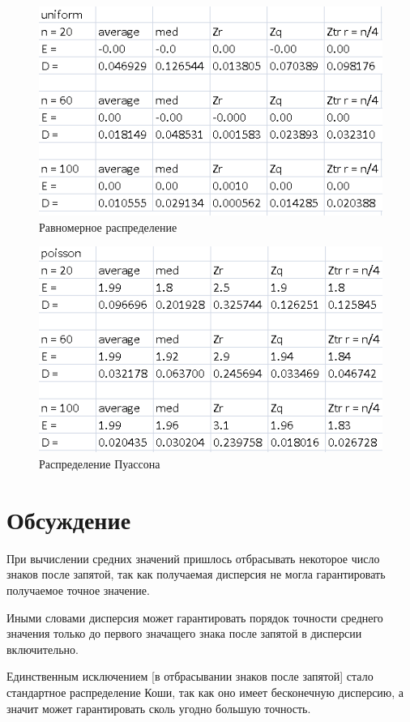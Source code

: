 \documentclass[a4]{article}
\begin{document}
\begin{figure}[H]
  \centering
  \includegraphics[width=\textwidth]{uniformFix.png}
  \caption{Равномерное распределение}
\end{figure}

\begin{figure}[H]
  \centering
  \includegraphics[width=\textwidth]{poissonFix.png} 
  \caption{Распределение Пуассона}
\end{figure}

\section{Обсуждение}
\par При вычислении средних значений пришлось отбрасывать некоторое число знаков после запятой, так как получаемая дисперсия не могла гарантировать получаемое точное значение. \par Иными словами дисперсия может гарантировать порядок точности среднего значения только до первого значащего знака после запятой в дисперсии включительно. \par Единственным исключением [в отбрасывании знаков после запятой] стало стандартное распределение Коши, так как оно имеет бесконечную дисперсию, а значит может гарантировать сколь угодно большую точность.
\end{document}
